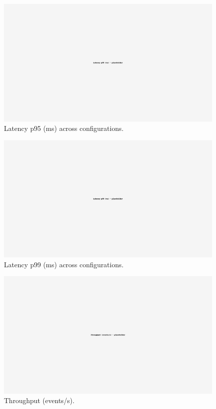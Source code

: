 \documentclass[10pt,twocolumn]{article}
\begin{document}
\begin{figure}[t]\centering
\includegraphics[width=\linewidth]{figures/latency_p95_ms.png}
\caption{Latency p95 (ms) across configurations.}\end{figure}

\begin{figure}[t]\centering
\includegraphics[width=\linewidth]{figures/latency_p99_ms.png}
\caption{Latency p99 (ms) across configurations.}\end{figure}

\begin{figure}[t]\centering
\includegraphics[width=\linewidth]{figures/throughput_eps.png}
\caption{Throughput (events/s).}\end{figure}
\end{document}
